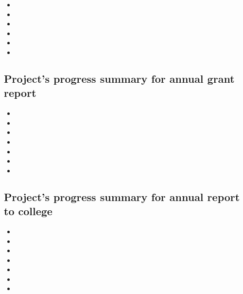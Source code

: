 \documentclass[11pt,letterpaper]{article}
\begin{document}
\begin{itemize}
\item 

\item 

\item 

\item 

\item 

\item 
\end{itemize}


\subsection{Project's progress summary for annual grant report}
\label{sec:org457e744}

\begin{itemize}
\item 

\item 

\item 

\item 

\item 

\item 

\item 
\end{itemize}



\subsection{Project's progress summary for annual report to college}
\label{sec:orge9d8dfd}

\begin{itemize}
\item 

\item 

\item 

\item 

\item 

\item 

\item 
\end{itemize}
\end{document}
